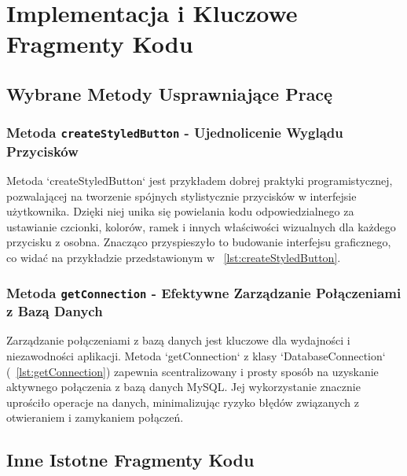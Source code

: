 \chapter{Implementacja i Kluczowe Fragmenty Kodu}
\section{Wybrane Metody Usprawniające Pracę}

\begin{minipage}{\linewidth}
\subsection{Metoda \texttt{createStyledButton} - Ujednolicenie Wyglądu Przycisków}
Metoda `createStyledButton` jest przykładem dobrej praktyki programistycznej, pozwalającej na tworzenie spójnych stylistycznie przycisków w interfejsie użytkownika. Dzięki niej unika się powielania kodu odpowiedzialnego za ustawianie czcionki, kolorów, ramek i innych właściwości wizualnych dla każdego przycisku z osobna. Znacząco przyspieszyło to budowanie interfejsu graficznego, co widać na przykładzie przedstawionym w \listingname~\ref{lst:createStyledButton}. 


\end{minipage}

\clearpage

\begin{minipage}{\linewidth}
\subsection{Metoda \texttt{getConnection} - Efektywne Zarządzanie Połączeniami z Bazą Danych}
Zarządzanie połączeniami z bazą danych jest kluczowe dla wydajności i niezawodności aplikacji. Metoda `getConnection` z klasy `DatabaseConnection` (\listingname~\ref{lst:getConnection}) zapewnia scentralizowany i prosty sposób na uzyskanie aktywnego połączenia z bazą danych MySQL. Jej wykorzystanie znacznie uprościło operacje na danych, minimalizując ryzyko błędów związanych z otwieraniem i zamykaniem połączeń. 


\end{minipage}

\section{Inne Istotne Fragmenty Kodu}

